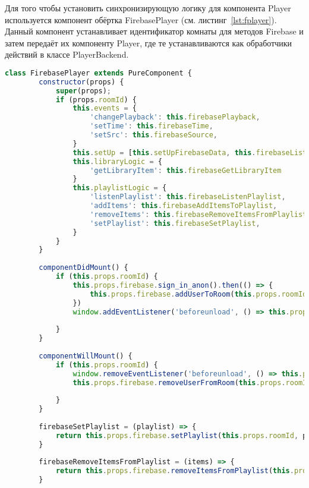 Для того чтобы установить синхронизирующую логику для компонента Player используется компонент обёртка FirebasePlayer (см. листинг~\ref{lst:fplayer}). 
Данный компонент устанавливает идентификатор комнаты для методов Firebase и затем передаёт их компоненту Player, где те устанавливаются как обработчики действий в классе PlayerBackend.
\begin{lstlisting}[language=JavaScript,label={lst:fplayer},caption={Компонент FirebasePlayer}]
    class FirebasePlayer extends PureComponent {
        constructor(props) {
            super(props);
            if (props.roomId) {
                this.events = {
                    'changePlayback': this.firebasePlayback,
                    'setTime': this.firebaseTime,
                    'setSrc': this.firebaseSource,
                }
                this.setUp = [this.setUpFirebaseData, this.firebaseListenSource, this.firebaseListenPlayback, this.firebaseListenTime]
                this.libraryLogic = {
                    'getLibraryItem': this.firebaseGetLibraryItem
                }
                this.playlistLogic = {
                    'listenPlaylist': this.firebaseListenPlaylist,
                    'addItems': this.firebaseAddItemsToPlaylist,
                    'removeItems': this.firebaseRemoveItemsFromPlaylist,
                    'setPlaylist': this.firebaseSetPlaylist,
                }
            }
        }
    
        componentDidMount() {
            if (this.props.roomId) {
                this.props.firebase.sign_in_anon().then(() => {
                    this.props.firebase.addUserToRoom(this.props.roomId);
                })
                window.addEventListener('beforeunload', () => this.props.firebase.removeUserFromRoom(this.props.roomId));
    
            }
        }
    
        componentWillMount() {
            if (this.props.roomId) {
                window.removeEventListener('beforeunload', () => this.props.firebase.removeUserFromRoom(this.props.roomId));
                this.props.firebase.removeUserFromRoom(this.props.roomId);
    
            }
        }
    
        firebaseSetPlaylist = (playlist) => {
            return this.props.firebase.setPlaylist(this.props.roomId, playlist);
        }
    
        firebaseRemoveItemsFromPlaylist = (items) => {
            return this.props.firebase.removeItemsFromPlaylist(this.props.roomId, items);
        }
    

\end{lstlisting}
